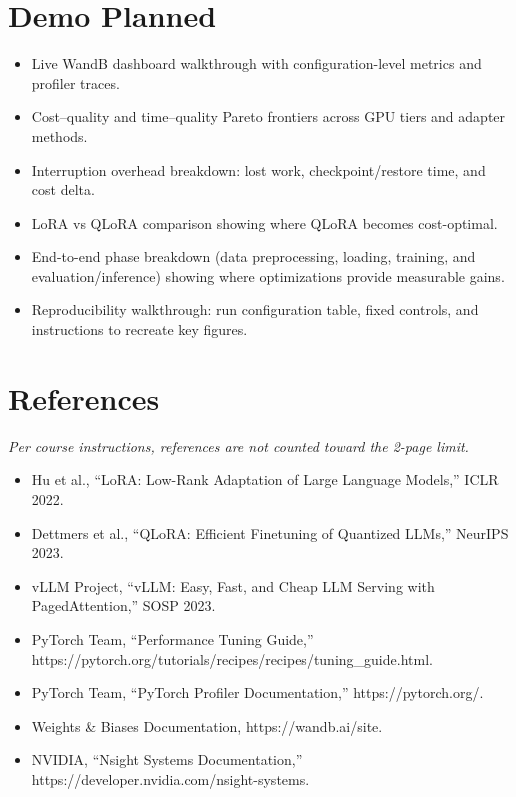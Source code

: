 \documentclass[10pt]{article}
\begin{document}
\section{Demo Planned}
\begin{itemize}
  \item Live WandB dashboard walkthrough with configuration-level metrics and profiler traces.
  \item Cost--quality and time--quality Pareto frontiers across GPU tiers and adapter methods.
  \item Interruption overhead breakdown: lost work, checkpoint/restore time, and cost delta.
  \item LoRA vs QLoRA comparison showing where QLoRA becomes cost-optimal.
  \item End-to-end phase breakdown (data preprocessing, loading, training, and evaluation/inference) showing where optimizations provide measurable gains.
  \item Reproducibility walkthrough: run configuration table, fixed controls, and instructions to recreate key figures.
\end{itemize}

\section{References}
\textit{Per course instructions, references are not counted toward the 2-page limit.}
\begin{itemize}
  \item Hu et al., ``LoRA: Low-Rank Adaptation of Large Language Models,'' ICLR 2022.
  \item Dettmers et al., ``QLoRA: Efficient Finetuning of Quantized LLMs,'' NeurIPS 2023.
  \item vLLM Project, ``vLLM: Easy, Fast, and Cheap LLM Serving with PagedAttention,'' SOSP 2023.
  \item PyTorch Team, ``Performance Tuning Guide,'' https://pytorch.org/tutorials/recipes/recipes/tuning_guide.html.
  \item PyTorch Team, ``PyTorch Profiler Documentation,'' https://pytorch.org/.
  \item Weights \& Biases Documentation, https://wandb.ai/site.
  \item NVIDIA, ``Nsight Systems Documentation,'' https://developer.nvidia.com/nsight-systems.
\end{itemize}
\end{document}
